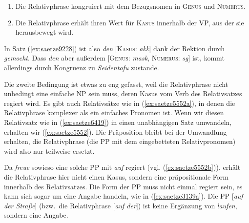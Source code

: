 \begin{enumerate}\Lf
  \item Die Relativphrase kongruiert mit dem Bezugsnomen in \textsc{Genus} und \textsc{Numerus}.
  \item Die Relativphrase erhält ihren Wert für \textsc{Kasus} innerhalb der VP, aus der sie herausbewegt wird.
\end{enumerate}

\noindent In Satz (\ref{ex:saetze9228}) ist also \textit{den} [\textsc{Kasus}: \textit{akk}] dank der Rektion durch \textit{gemocht}.
Dass \textit{den} aber außerdem [\textsc{Genus}: \textit{mask}, \textsc{Numerus}: \textit{sg}] ist, kommt allerdings durch Kongruenz zu \textit{Seidentofu} zustande.

Die zweite Bedingung ist etwas zu eng gefasst, weil die Relativphrase nicht unbedingt eine einfache NP sein muss, deren Kasus vom Verb des Relativsatzes regiert wird.
Es gibt auch Relativsätze wie in (\ref{ex:saetze5552a}), in denen die Relativphrase komplexer als ein einfaches Pronomen ist.
Wenn wir diesen Relativsatz wie in (\ref{ex:saetze6419}) in einen unabhängigen Satz umwandeln, erhalten wir (\ref{ex:saetze5552}).
Die Präposition bleibt bei der Umwandlung erhalten, die Relativphrase (die PP mit dem eingebetteten Relativpronomen) wird also nur teilweise ersetzt.

\begin{exe}
  \ex\label{ex:saetze5552} 
    \begin{xlist}
    \end{xlist} 
\end{exe}

Da \textit{freue} sowieso eine solche PP mit \textit{auf} regiert (vgl. (\ref{ex:saetze5552b})), erhält die Relativphrase hier nicht einen Kasus, sondern eine präpositionale Form innerhalb des Relativsatzes.
Die Form der PP muss nicht einmal regiert sein, es kann sich sogar um eine Angabe handeln, wie in (\ref{ex:saetze3139a}).
Die PP [\textit{auf der Straße}] (bzw.\ die Relativphrase [\textit{auf der}]) ist keine Ergänzung von \textit{laufen}, sondern eine Angabe.

\begin{exe}
  \ex\label{ex:saetze3139}
  \begin{xlist}
  \end{xlist}
\end{exe}


